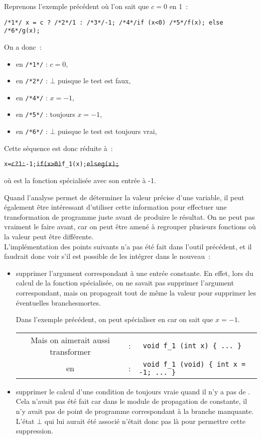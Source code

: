 \begin{exemple}
  Reprenons l'exemple précédent où l'on sait que $c=0$ en 1~:
\begin{center}
  \verb!/*1*/ x = c ? /*2*/1 : /*3*/-1; /*4*/if (x<0) /*5*/f(x); else /*6*/g(x); !
\end{center}
On a donc~:
\begin{itemize}
  \item en \verb!/*1*/! : $c=0$,
  \item en \verb!/*2*/! : $\bot$ puisque le test est faux,
  \item en \verb!/*4*/! : $x=-1$,
  \item en \verb!/*5*/! : toujours $x=-1$,
  \item en \verb!/*6*/! : $\bot$ puisque le test est toujours vrai,
\end{itemize}
Cette séquence est donc réduite à~:
\begin{alltt}
  x = \sout{ c ? 1 : } -1; \sout{ if (x>0)} f\_1(x); \sout{ else  g(x); }
\end{alltt}
où  est la fonction  spécialisée avec son entrée à -1.\\
\end{exemple}

Quand l'analyse permet de déterminer la valeur précise d'une variable,
il peut également être intéressant d'utiliser cette information pour effectuer
une transformation de programme juste avant de produire le résultat.
On ne peut pas vraiment le faire avant, car on peut être amené à regrouper
plusieurs fonctions où la valeur peut être différente.\\


L'implémentation des points suivants n'a pas été fait dans l'outil précédent,
et il faudrait donc voir s'il est possible de les intégrer
dans le nouveau~:
  \begin{itemize}
    \item supprimer l'argument correspondant à une entrée constante.
En effet, lors du calcul de la fonction spécialisée, on ne savait
pas supprimer l'argument correspondant,
mais on propageait tout de même la valeur pour supprimer les éventuelles
branchesmortes.
\begin{exemple}
Dans l'exemple précédent,
on peut spécialiser  en  car on sait que $x=-1$.

\begin{tabular}{ccl}
Mais on aimerait aussi transformer &:& \verb! void f_1 (int x) { ... }!\\
en &:& \verb! void f_1 (void) { int x = -1; ... }!
\end{tabular}
\end{exemple}
\item supprimer le calcul d'une condition de  toujours vraie quand il
  n'y a pas de . Cela n'avait pas été fait car dans
le module de propagation de constante,
il n'y avait pas de point de programme correspondant à la branche
 manquante. L'état $\bot$ qui lui aurait été
 associé n'était donc pas là pour permettre cette suppression.

  \end{itemize}

